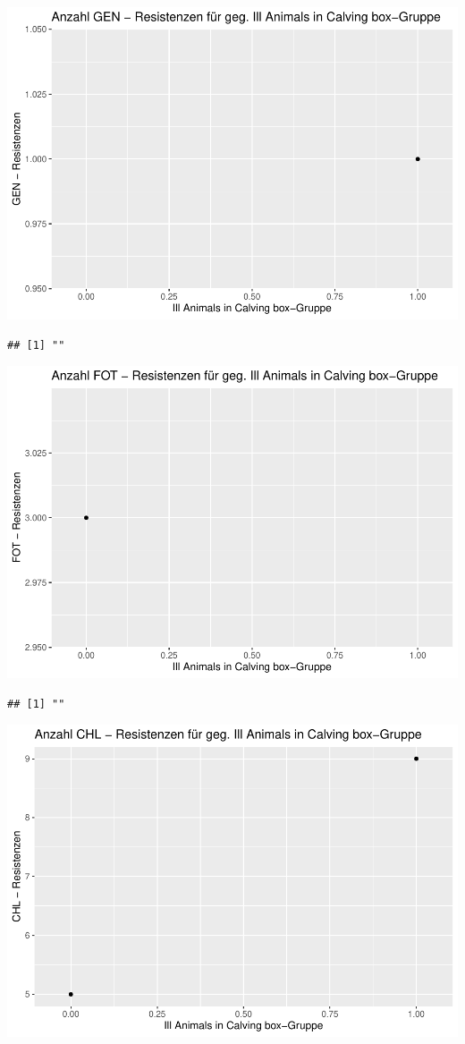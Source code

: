 \documentclass[
]{article}
\begin{document}
\includegraphics{NResistenzen_files/figure-latex/unnamed-chunk-7-24.pdf}

\begin{verbatim}
## [1] ""
\end{verbatim}

\includegraphics{NResistenzen_files/figure-latex/unnamed-chunk-7-25.pdf}

\begin{verbatim}
## [1] ""
\end{verbatim}

\includegraphics{NResistenzen_files/figure-latex/unnamed-chunk-7-26.pdf}
\end{document}
